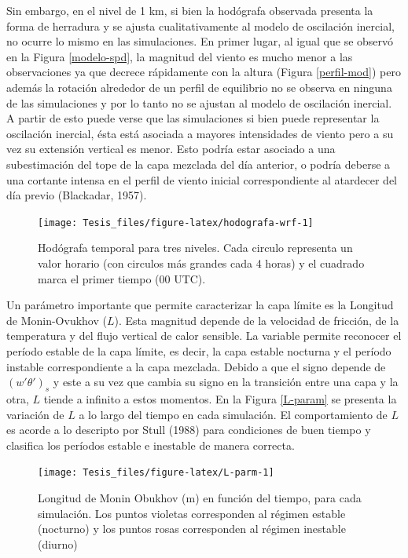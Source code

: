 \documentclass[12pt,spanish,oneside, a4paper]{book}
\begin{document}
Sin embargo, en el nivel de 1 km, si bien la hodógrafa observada
presenta la forma de herradura y se ajusta cualitativamente al modelo de
oscilación inercial, no ocurre lo mismo en las simulaciones. En primer
lugar, al igual que se observó en la Figura \ref{modelo-spd}, la
magnitud del viento es mucho menor a las observaciones ya que decrece
rápidamente con la altura (Figura \ref{perfil-mod}) pero además la
rotación alrededor de un perfil de equilibrio no se observa en ninguna
de las simulaciones y por lo tanto no se ajustan al modelo de oscilación
inercial. A partir de esto puede verse que las simulaciones si bien
puede representar la oscilación inercial, ésta está asociada a mayores
intensidades de viento pero a su vez su extensión vertical es menor.
Esto podría estar asociado a una subestimación del tope de la capa
mezclada del día anterior, o podría deberse a una cortante intensa en el
perfil de viento inicial correspondiente al atardecer del día previo
(Blackadar, 1957).

\begin{figure}

{\centering \texttt{[image: Tesis\_files/figure-latex/hodografa-wrf-1]} 

}

\caption{Hodógrafa temporal para tres niveles. Cada circulo representa un valor horario (con circulos más grandes cada 4 horas) y el cuadrado marca el primer tiempo (00 UTC). \label{hodografa-mod}}\label{fig:hodografa-wrf}
\end{figure}

Un parámetro importante que permite caracterizar la capa límite es la
Longitud de Monin-Ovukhov (\(L\)). Esta magnitud depende de la velocidad
de fricción, de la temperatura y del flujo vertical de calor sensible.
La variable permite reconocer el período estable de la capa límite, es
decir, la capa estable nocturna y el período instable correspondiente a
la capa mezclada. Debido a que el signo depende de \((w'\theta ')_s\) y
este a su vez que cambia su signo en la transición entre una capa y la
otra, \(L\) tiende a infinito a estos momentos. En la Figura
\ref{L-param} se presenta la variación de \(L\) a lo largo del tiempo en
cada simulación. El comportamiento de \(L\) es acorde a lo descripto por
Stull (1988) para condiciones de buen tiempo y clasifica los períodos
estable e inestable de manera correcta.

\begin{figure}

{\centering \texttt{[image: Tesis\_files/figure-latex/L-parm-1]} 

}

\caption{Longitud de Monin Obukhov (m) en función del tiempo, para cada simulación. Los puntos violetas corresponden al régimen estable (nocturno) y los puntos rosas corresponden al régimen inestable (diurno) \label{L-param}}\label{fig:L-parm}
\end{figure}
\end{document}
